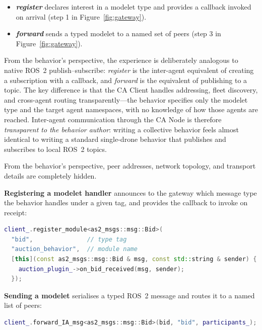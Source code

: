\documentclass[deliverable]{csreport}
\begin{document}
\begin{itemize}
  \item \textbf{\textit{register}} declares interest in a modelet type and provides a callback invoked on arrival (step 1 in Figure~\ref{fig:gateway}).
  \item \textbf{\textit{forward}} sends a typed modelet to a named set of peers (step 3 in Figure~\ref{fig:gateway}).
\end{itemize}

From the behavior's perspective, the experience is deliberately analogous to native ROS~2 publish--subscribe: \textit{register} is the inter-agent equivalent of creating a subscription with a callback, and \textit{forward} is the equivalent of publishing to a topic. The key difference is that the CA Client handles addressing, fleet discovery, and cross-agent routing transparently---the behavior specifies only the modelet type and the target agent namespaces, with no knowledge of how those agents are reached. Inter-agent communication through the CA Node is therefore \emph{transparent to the behavior author}: writing a collective behavior feels almost identical to writing a standard single-drone behavior that publishes and subscribes to local ROS~2 topics.

From the behavior's perspective, peer addresses, network topology, and transport details are completely hidden.

\textbf{Registering a modelet handler} announces to the gateway which message type the behavior handles under a given tag, and provides the callback to invoke on receipt:

\begin{lstlisting}[language=C++, style=cppcolors,caption={Registering a typed modelet handler}]
client_.register_module<as2_msgs::msg::Bid>(
  "bid",               // type tag
  "auction_behavior",  // module name
  [this](const as2_msgs::msg::Bid & msg, const std::string & sender) {
    auction_plugin_->on_bid_received(msg, sender);
  });
\end{lstlisting}

\textbf{Sending a modelet} serialises a typed ROS~2 message and routes it to a named list of peers:

\begin{lstlisting}[language=C++, style=cppcolors,caption={Forwarding a typed modelet to a list of peers}]
client_.forward_IA_msg<as2_msgs::msg::Bid>(bid, "bid", participants_);
\end{lstlisting}
\end{document}
